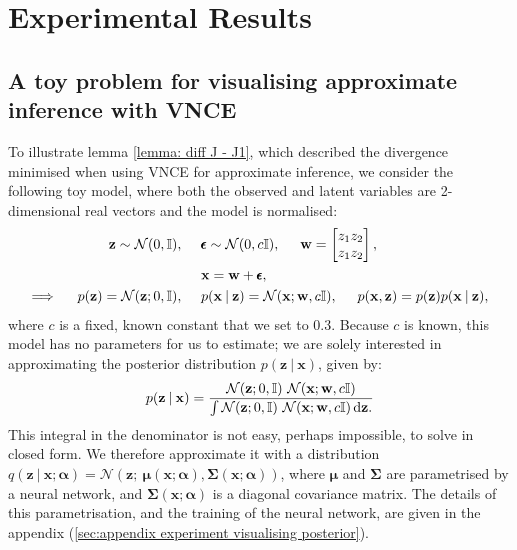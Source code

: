 \documentclass[11pt, oneside]{article}
\newcommand{\alphab}{{\boldsymbol{\alpha}}}
\newcommand{\mub}{\boldsymbol{\mu}}
\newcommand{\Sigmab}{\boldsymbol{\Sigma}}
\newcommand{\x}{{\mathbf x}}
\newcommand{\z}{{\mathbf z}}
\newcommand{\N}{\mathcal{N}}
\newcommand{\I}{{\mathbb I}}
\newcommand\given[1][]{\:#1\vert\:}
\theoremstyle{definition}
\begin{document}
\newpage
\section{Experimental Results}
\subsection{A toy problem for visualising approximate inference with VNCE}
To illustrate lemma \ref{lemma: diff J - J1}, which described the divergence minimised when using VNCE for approximate inference, we consider the following toy model, where both the observed and latent variables are 2-dimensional real vectors and the model is normalised:
\begin{align}
    \z \sim \N(0, \I), \hspace{5mm} &\pmb{\epsilon} \sim \N(0, c\I), \hspace{5mm} \textbf{w} = \begin{bmatrix} z_{1}z_{2} \\ z_{1}z_{2} \\ \end{bmatrix}, \\ 
    &\x = \textbf{w} + \pmb{\epsilon}, \hspace{5mm} \\ 
     \Longrightarrow \hspace{5mm} p(\z) = \N(\z ;0, \I), \hspace{5mm} &p(\x \given \z) = \N(\x ;\textbf{w}, c \I), \hspace{5mm} p(\x, \z) = p(\z) p(\x \given \z),
\end{align}
where $c$ is a fixed, known constant that we set to $0.3$. Because $c$ is known, this model has no parameters for us to estimate; we are solely interested in approximating the posterior distribution $p(\z \given \x)$, given by:
\begin{equation}
    p(\z \given\x) = \frac{\N(\z ;0, \I) \ \N(\x ;\textbf{w}, c \I)}{\int \N(\z ;0, \I) \ \N(\x ;\textbf{w}, c \I) \dif \z .}
\end{equation}
This integral in the denominator is not easy, perhaps impossible, to solve in closed form. We therefore approximate it with a distribution $q(\z \given \x ; \alphab) = \N(\z ; \ \mub(\x; \alphab), \Sigmab(\x; \alphab))$, where $\mub$ and $\Sigmab$ are parametrised by a neural network, and $\Sigmab(\x; \alphab)$ is a diagonal covariance matrix. The details of this parametrisation, and the training of the neural network, are given in the appendix (\ref{sec:appendix experiment visualising posterior}).
\end{document}
